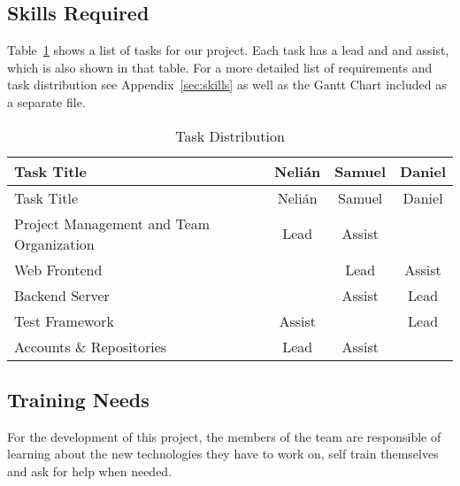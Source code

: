 \subsection{Skills Required}

Table~\ref{tasks} shows a list of tasks for our project. Each task has a lead and and assist, which is also shown in that table. For a more detailed list of requirements and task distribution see Appendix~\ref{sec:skills} as well as the Gantt Chart included as a separate file.

\begin{center}
\setlength{\extrarowheight}{1.5pt}
  \begin{longtable}{|m{3.25in}|c|c|c|}
 \caption{Task Distribution \label{tasks}} \\
   \hline
  
  \centering Task Title & Nelián & Samuel & Daniel \\
  \hline \hline \endfirsthead
  
     \hline

	\centering Task Title & Nelián & Samuel & Daniel \\  
	\hline \hline \endhead
  
  \endfoot  
  
  Project Management and Team Organization & Lead & Assist & \\ \hline
  Web Frontend & & Lead & Assist \\ \hline
  Backend Server & & Assist & Lead \\ \hline
  Test Framework & Assist & & Lead \\ \hline
  Accounts \& Repositories & Lead & Assist & \\ \hline
   \end{longtable}
\end{center}

\subsection{Training Needs}
For the development of this project, the members of the team are responsible of learning about the new technologies they have to work on, self train themselves and ask for help when needed.  

